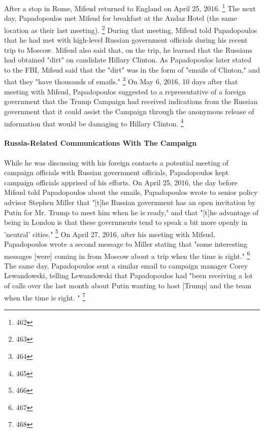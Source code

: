 After a stop in Rome, Mifsud returned to England on April 25, 2016.%
\footnote{462}
The next day, Papadopoulos met Mifsud for breakfast at the Andaz Hotel (the same location as their last meeting).%
\footnote{463}
During that meeting, Mifsud told Papadopoulos that he had met with high-level Russian government officials during his recent trip to Moscow.
Mifsud also said that, on the trip, he learned that the Russians had obtained "dirt" on candidate Hillary Clinton.
As Papadopoulos later stated to the FBI, Mifsud said that the "dirt" was in the form of "emails of Clinton," and that they "have thousands of emails."%
\footnote{464}
On May 6, 2016, 10 days after that meeting with Mifsud, Papadopoulos suggested to a representative of a foreign government that the Trump Campaign had received indications from the Russian government that it could assist the Campaign through the anonymous release of information that would be damaging to Hillary Clinton.%
\footnote{465}

\paragraph{Russia-Related Communications With The Campaign}

While he was discussing with his foreign contacts a potential meeting of campaign officials with Russian government officials, Papadopoulos kept campaign officials apprised of his efforts.
On April 25, 2016, the day before Mifsud told Papadopoulos about the emails, Papadopoulos wrote to senior policy advisor Stephen Miller that "[t]he Russian government has an open invitation by Putin for Mr. Trump to meet him when he is ready," and that "[t]he advantage of being in London is that these governments tend to speak a bit more openly in 'neutral' cities."%
\footnote{466}
On April 27, 2016, after his meeting with Mifsud, Papadopoulos wrote a second message to Miller stating that "some interesting messages [were] coming in from Moscow about a trip when the time is right."%
\footnote{467}
The same day, Papadopoulos sent a similar email to campaign manager Corey Lewandowski, telling Lewandowski that Papadopoulos had "been receiving a lot of calls over the last month about Putin wanting to host [Trump] and the team when the time is right. "%
\footnote{468}


